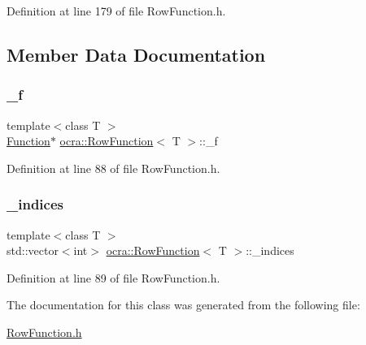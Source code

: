 Definition at line 179 of file Row\+Function.\+h.



\subsection{Member Data Documentation}
\hypertarget{classocra_1_1RowFunction_a336ba922ce93c2c1357b4298acfd0c2b}{}\label{classocra_1_1RowFunction_a336ba922ce93c2c1357b4298acfd0c2b} 
\subsubsection{\texorpdfstring{\+\_\+f}{\_f}}
{\footnotesize\ttfamily template$<$class T $>$ \\
\hyperlink{classocra_1_1Function}{Function}$\ast$ \hyperlink{classocra_1_1RowFunction}{ocra\+::\+Row\+Function}$<$ T $>$\+::\+\_\+f\hspace{0.3cm}{\ttfamily [protected]}}



Definition at line 88 of file Row\+Function.\+h.

\hypertarget{classocra_1_1RowFunction_afaa713596ca3c785cd9bb7599518ab0e}{}\label{classocra_1_1RowFunction_afaa713596ca3c785cd9bb7599518ab0e} 
\subsubsection{\texorpdfstring{\+\_\+indices}{\_indices}}
{\footnotesize\ttfamily template$<$class T $>$ \\
std\+::vector$<$int$>$ \hyperlink{classocra_1_1RowFunction}{ocra\+::\+Row\+Function}$<$ T $>$\+::\+\_\+indices\hspace{0.3cm}{\ttfamily [protected]}}



Definition at line 89 of file Row\+Function.\+h.



The documentation for this class was generated from the following file\+:\begin{DoxyCompactItemize}
\item 
\hyperlink{RowFunction_8h}{Row\+Function.\+h}\end{DoxyCompactItemize}
